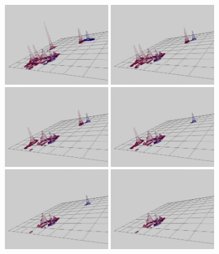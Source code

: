 \begin{figure}
\centering
\includegraphics[width=0.4\textwidth,bb=0 0 760 585]{inf1.jpg}
\includegraphics[width=0.4\textwidth,bb=0 0 760 585]{inf2.jpg}\\

\includegraphics[width=0.4\textwidth,bb=0 0 760 585]{inf3.jpg}
\includegraphics[width=0.4\textwidth,bb=0 0 760 585]{inf4.jpg}\\

\includegraphics[width=0.4\textwidth,bb=0 0 760 585]{inf5.jpg}
\includegraphics[width=0.4\textwidth,bb=0 0 760 585]{inf6.jpg}\\


\end{figure}
